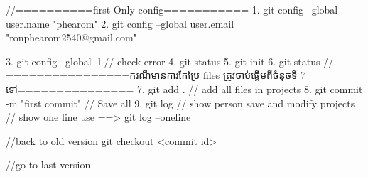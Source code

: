 //==========first Only config===========
1. git config --global user.name "phearom"
2. git config --global user.email "ronphearom2540@gmail.com"

3. git config --global -l // check error
4. git status
5. git init
6. git status
// ================ករណីមានការកែប្រែ files ត្រូវចាប់ផ្តើមពីចំនុចទី 7 ទៅ===============
7. git add . // add all files in projects
8. git commit -m "first commit" // Save all
9. git log // show person save and modify projects // show one line use ==> git log --oneline

//back to old version
git checkout <commit id>

//go to last version